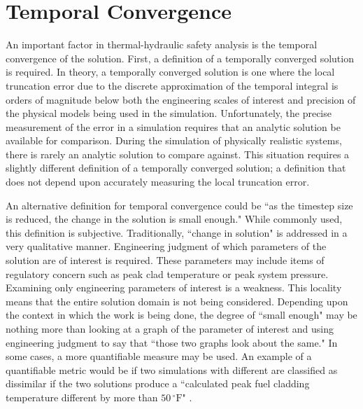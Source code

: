 \section{Temporal Convergence}
\label{sect:temporal_convergence}

An important factor in thermal-hydraulic safety analysis is the temporal convergence of the solution.
First, a definition of a temporally converged solution is required.
In theory, a temporally converged solution is one where the local truncation error due to the discrete approximation of the temporal integral is orders of magnitude below both the engineering scales of interest and precision of the physical models being used in the simulation.
Unfortunately, the precise measurement of the error in a simulation requires that an analytic solution be available for comparison.
During the simulation of physically realistic systems, there is rarely an analytic solution to compare against.
This situation requires a slightly different definition of a temporally converged solution; a definition that does not depend upon accurately measuring the local truncation error.

An alternative definition for temporal convergence could be ``as the timestep size is reduced, the change in the solution is small enough."
While commonly used, this definition is subjective.
Traditionally, ``change in solution" is addressed in a very qualitative manner.
Engineering judgment of which parameters of the solution are of interest is required.
These parameters may include items of regulatory concern such as peak clad temperature or peak system pressure.
Examining only engineering parameters of interest is a weakness.
This locality means that the entire solution domain is not being considered.
Depending upon the context in which the work is being done, the degree of ``small enough" may be nothing more than looking at a graph of the parameter of interest and using engineering judgment to say that ``those two graphs look about the same."
In some cases, a more quantifiable measure may be used.
An example of a quantifiable metric would be if two simulations with different \dtmax{} are classified as dissimilar if the two solutions produce a ``calculated peak fuel cladding temperature different by more than $50\,^{\circ}\mathrm{F}$" \cite{CFR10}.

